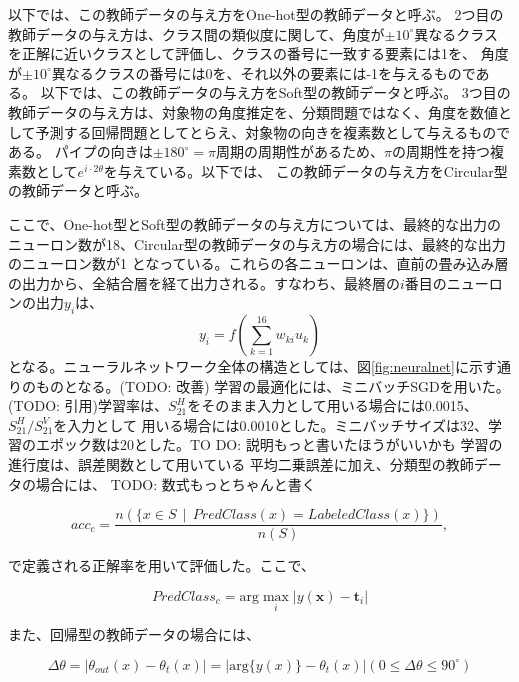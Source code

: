 \documentclass[11pt,a4paper,uplatex]{ujarticle}
\begin{document}
  以下では、この教師データの与え方をOne-hot型の教師データと呼ぶ。
  2つ目の教師データの与え方は、クラス間の類似度に関して、角度が$\pm10^{\circ}$異なるクラス
  を正解に近いクラスとして評価し、クラスの番号に一致する要素には1を、 角度が$\pm10^{\circ}$異なるクラスの番号には0を、それ以外の要素には-1を与えるものである。
  以下では、この教師データの与え方をSoft型の教師データと呼ぶ。
  3つ目の教師データの与え方は、対象物の角度推定を、分類問題ではなく、角度を数値として予測する回帰問題としてとらえ、対象物の向きを複素数として与えるものである。
  パイプの向きは$\pm180^{\circ} = \pi$周期の周期性があるため、$\pi$の周期性を持つ複素数として$e^{i\cdot2\theta}$を与えている。以下では、
  この教師データの与え方をCircular型の教師データと呼ぶ。

  ここで、One-hot型とSoft型の教師データの与え方については、最終的な出力のニューロン数が18、Circular型の教師データの与え方の場合には、最終的な出力のニューロン数が1
  となっている。これらの各ニューロンは、直前の畳み込み層の出力から、全結合層を経て出力される。すなわち、最終層の$i$番目のニューロンの出力$y_i$は、
  \[
    y_i = f(\sum_{k=1}^{16} w_{ki} u_k)
  \]
  となる。ニューラルネットワーク全体の構造としては、図\ref{fig:neuralnet}に示す通りのものとなる。(TODO: 改善)
  学習の最適化には、ミニバッチSGDを用いた。(TODO: 引用)学習率は、$S_{21}^H$をそのまま入力として用いる場合には0.0015、$S_{21}^{H}/S_{21}^{V}$を入力として
  用いる場合には0.0010とした。ミニバッチサイズは32、学習のエポック数は20とした。TO DO: 説明もっと書いたほうがいいかも
  学習の進行度は、誤差関数として用いている
  平均二乗誤差に加え、分類型の教師データの場合には、
  TODO: 数式もっとちゃんと書く

  \begin{equation}
    acc_{c} = \frac{n(\{x \in S \, \mid\, PredClass(x) = LabeledClass(x)\})}{n(S)},
  \end{equation} %

  で定義される正解率を用いて評価した。ここで、

  \begin{equation}
    PredClass_{c} = \mathrm{arg}\max_{i} |y(\mathbf{x}) - \mathbf{t}_i|
  \end{equation} %
  
  また、回帰型の教師データの場合には、

  \begin{equation}
    \Delta\theta = |\theta_{out}(x) - \theta_{t}(x)| =  |\mathrm{arg}\{y(x)\}- \theta_{t}(x)| ( 0 \le \Delta\theta \le 90^{\circ})
  \end{equation} %
\end{document}
